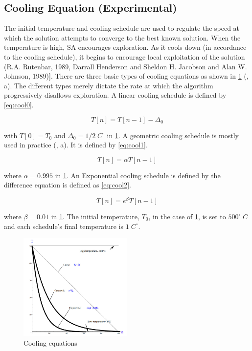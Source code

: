 \documentclass[11pt,a4paper,final]{article}
\newcommand{\Tau}{T}                        %
\begin{document}
\subsection{Cooling Equation (Experimental)}
\label{cooling-equation-experimental}
The initial temperature and cooling schedule are used to regulate the speed at which the solution attempts to converge
to the best known solution. When the temperature is high, SA encourages exploration. As it cools down (in accordance to
the cooling schedule), it begins to encourage local exploitation of the solution
(R.A. Rutenbar, 1989, Darrall Henderson and Sheldon H. Jacobson and Alan W. Johnson, 1989)]. There are three basic types of cooling equations as
shown in \ref{fig:cool} (, a). The different types merely dictate the rate at which the algorithm
progressively disallows exploration. A linear cooling schedule is defined by \ref{eq:cool0}.

\begin{equation}
\label{eq:cool0}
\Tau[n] = \Tau[n-1] - \Delta_0
\end{equation}

with \(\Tau[0] = \Tau_0\) and \(\Delta_0 = 1/2\; C^\circ\) in \ref{fig:cool}. A geometric cooling schedule is mostly used in practice
(, a). It is defined by \ref{eq:cool1}.

\begin{equation}
\label{eq:cool1}
\Tau[n] = \alpha \Tau[n-1]
\end{equation}

where \(\alpha = 0.995\) in \ref{fig:cool}. An Exponential cooling schedule is defined by the difference equation is defined as
\ref{eq:cool2}.

\begin{equation}
\label{eq:cool2}
\Tau[n] = e^{\beta}\Tau[n-1]
\end{equation}

where \(\beta = 0.01\) in \ref{fig:cool}. The initial temperature, \(T_0\), in the case of \ref{fig:cool}, is set to \(500^\circ\; C\) and
each schedule's final temperature is \(1\; C^\circ\).

\begin{figure}[htbp]
\centering
\includegraphics[width=0.5\textwidth]{sections/img/cool-func.jpg}
\caption{\label{fig:cool}Cooling equations}
\end{figure}
\end{document}
